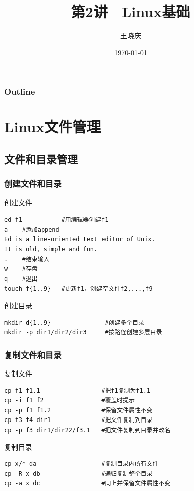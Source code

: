 \documentclass[xcolor=svgnames,presentation]{beamer}
\title{第2讲　Linux基础}
\author{王晓庆}
\date{\today}
\institute{wangxiaoqing@outlook.com}
\begin{document}
\maketitle

\begin{frame}
\frametitle{Outline}
\setcounter{tocdepth}{1}
\tableofcontents
\end{frame}

\section{Linux文件管理}
\label{sec-1}
\subsection{文件和目录管理}
\label{sec-1-1}
\begin{frame}[fragile]
\frametitle{创建文件和目录}
\label{sec-1-1-1}
\begin{exampleblock}{创建文件}
\label{sec-1-1-1-1}


\begin{verbatim}
ed f1           #用编辑器创建f1
a    #添加append
Ed is a line-oriented text editor of Unix.
It is old, simple and fun.
.    #结束输入
w    #存盘
q    #退出
touch f{1..9}   #更新f1，创建空文件f2,...,f9
\end{verbatim}
\end{exampleblock}
\begin{block}{创建目录}
\label{sec-1-1-1-2}


\begin{verbatim}
mkdir d{1..9}               #创建多个目录
mkdir -p dir1/dir2/dir3     #按路径创建多层目录
\end{verbatim}
\end{block}
\end{frame}
\begin{frame}[fragile]
\frametitle{复制文件和目录}
\label{sec-1-1-2}
\begin{exampleblock}{复制文件}
\label{sec-1-1-2-1}


\begin{verbatim}
cp f1 f1.1                 #把f1复制为f1.1
cp -i f1 f2                #覆盖时提示
cp -p f1 f1.2              #保留文件属性不变
cp f3 f4 dir1              #把文件复制到目录
cp -p f3 dir1/dir22/f3.1   #把文件复制到目录并改名
\end{verbatim}
\end{exampleblock}
\begin{block}{复制目录}
\label{sec-1-1-2-2}


\begin{verbatim}
cp x/* da                  #复制目录内所有文件
cp -R x db                 #递归复制整个目录
cp -a x dc                 #同上并保留文件属性不变
\end{verbatim}
\end{block}
\end{frame}
\end{document}
